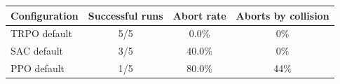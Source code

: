 \begin{tabular}{lccc}
\toprule
Configuration & Successful runs & Abort rate & Aborts by collision \\
\midrule
TRPO default & 5/5 & 0.0\% & 0\% \\
SAC default & 3/5 & 40.0\% & 0\% \\
PPO default & 1/5 & 80.0\% & 44\% \\
\bottomrule
\end{tabular}
